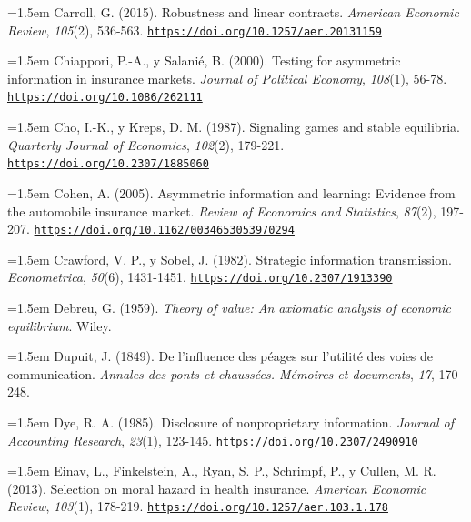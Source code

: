 \documentclass[10pt,a4paper]{article}
\begin{document}
\noindent\hangindent=1.5em Carroll, G. (2015). Robustness and linear contracts. \textit{American Economic Review}, \textit{105}(2), 536-563. \href{https://doi.org/10.1257/aer.20131159}{\nolinkurl{https://doi.org/10.1257/aer.20131159}}

\noindent\hangindent=1.5em Chiappori, P.-A., y Salanié, B. (2000). Testing for asymmetric information in insurance markets. \textit{Journal of Political Economy}, \textit{108}(1), 56-78. \href{https://doi.org/10.1086/262111}{\nolinkurl{https://doi.org/10.1086/262111}}

\noindent\hangindent=1.5em Cho, I.-K., y Kreps, D. M. (1987). Signaling games and stable equilibria. \textit{Quarterly Journal of Economics}, \textit{102}(2), 179-221. \href{https://doi.org/10.2307/1885060}{\nolinkurl{https://doi.org/10.2307/1885060}}

\noindent\hangindent=1.5em Cohen, A. (2005). Asymmetric information and learning: Evidence from the automobile insurance market. \textit{Review of Economics and Statistics}, \textit{87}(2), 197-207. \href{https://doi.org/10.1162/0034653053970294}{\nolinkurl{https://doi.org/10.1162/0034653053970294}}

\noindent\hangindent=1.5em Crawford, V. P., y Sobel, J. (1982). Strategic information transmission. \textit{Econometrica}, \textit{50}(6), 1431-1451. \href{https://doi.org/10.2307/1913390}{\nolinkurl{https://doi.org/10.2307/1913390}}

\noindent\hangindent=1.5em Debreu, G. (1959). \textit{Theory of value: An axiomatic analysis of economic equilibrium}. Wiley.

\noindent\hangindent=1.5em Dupuit, J. (1849). De l'influence des péages sur l'utilité des voies de communication. \textit{Annales des ponts et chaussées. Mémoires et documents}, \textit{17}, 170-248.

\noindent\hangindent=1.5em Dye, R. A. (1985). Disclosure of nonproprietary information. \textit{Journal of Accounting Research}, \textit{23}(1), 123-145. \href{https://doi.org/10.2307/2490910}{\nolinkurl{https://doi.org/10.2307/2490910}}

\noindent\hangindent=1.5em Einav, L., Finkelstein, A., Ryan, S. P., Schrimpf, P., y Cullen, M. R. (2013). Selection on moral hazard in health insurance. \textit{American Economic Review}, \textit{103}(1), 178-219. \href{https://doi.org/10.1257/aer.103.1.178}{\nolinkurl{https://doi.org/10.1257/aer.103.1.178}}
\end{document}
